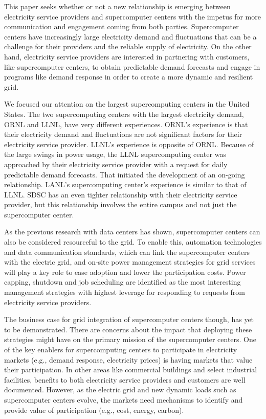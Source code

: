 This paper seeks whether or not a new relationship is emerging between electricity service providers 
and supercomputer centers with the impetus for more communication and engagement coming from both parties.  
Supercomputer centers have increasingly large electricity demand and fluctuations that can be a challenge 
for their providers and the reliable supply of electricity.  On the other hand, electricity service providers 
are interested in partnering with customers, like supercomputer centers, to obtain predictable demand 
forecasts and engage in programs like demand response in order to create a more dynamic and resilient grid.

We focused our attention on the largest supercomputing centers in the United States. The two supercomputing 
centers with the largest electricity demand, ORNL and LLNL, have very different experiences.  ORNL’s 
experience is that their electricity demand and fluctuations are not significant factors for their 
electricity service provider.  LLNL’s experience is opposite of ORNL.  Because of the large swings in 
power usage, the LLNL supercomputing center was approached by their electricity service provider with a 
request for daily predictable demand forecasts.   That initiated the development of an on-going relationship.  
LANL’s supercomputing center’s experience is similar to that of LLNL. SDSC has an even tighter relationship 
with their electricity service provider, but this relationship involves the entire campus and not just the 
supercomputer center.  

As the previous research with data centers has shown, supercomputer centers can also be considered 
resourceful to the grid. To enable this, automation technologies and data communication standards, 
which can link the supercomputer centers with the electric grid, and on-site power management strategies 
for grid services will play a key role to ease adoption and lower the participation costs.  Power capping, 
shutdown and job scheduling are identified as the most interesting management strategies with highest 
leverage for responding to requests from electricity service providers.  

The business case for grid integration of supercomputer centers though, has yet to be demonstrated.  
There are concerns about the impact that deploying these strategies might have on the primary mission 
of the supercomputer centers.  One of the key enablers for supercomputing centers to participate in 
electricity markets (e.g., demand response, electricity prices) is having markets that value their 
participation. In other areas like commercial buildings and select industrial facilities, benefits to 
both electricity service providers and customers are well documented. However, as the electric grid 
and new dynamic loads such as supercomputer centers evolve, the markets need mechanisms to identify 
and provide value of participation (e.g., cost, energy, carbon).

